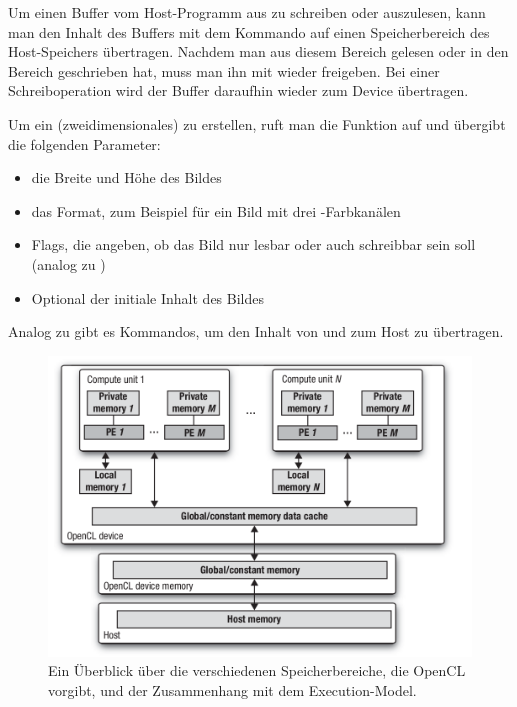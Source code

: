 Um einen Buffer vom Host-Programm aus zu schreiben oder auszulesen,
kann man den Inhalt des Buffers mit dem Kommando
 auf einen Speicherbereich des
Host-Speichers übertragen. Nachdem man aus diesem Bereich gelesen oder
in den Bereich geschrieben hat, muss man ihn mit
 wieder freigeben. Bei einer
Schreiboperation wird der Buffer daraufhin wieder zum Device übertragen.

Um ein (zweidimensionales)  zu erstellen, ruft man die Funktion
 auf und übergibt die folgenden Parameter:

\begin{itemize}
\item die Breite und Höhe des Bildes
\item das Format, zum Beispiel  für ein Bild mit drei -Farbkanälen
\item Flags, die angeben, ob das Bild nur lesbar oder auch schreibbar sein soll (analog zu )
\item Optional der initiale Inhalt des Bildes
\end{itemize}

Analog zu  gibt es Kommandos, um den Inhalt von und zum Host zu übertragen.

\begin{figure}[ht]
\centering
\includegraphics[width=12cm]{images/memory_model}
\caption{Ein Überblick über die verschiedenen Speicherbereiche, die OpenCL vorgibt, und der Zusammenhang mit dem Execution-Model.}
\label{fig:opencl_memory_model}
\end{figure}

